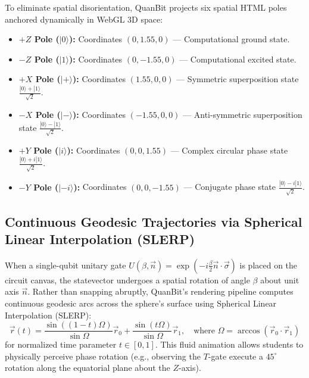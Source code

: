 \documentclass[11pt, a4paper]{article}
\begin{document}
To eliminate spatial disorientation, QuanBit projects six spatial HTML poles anchored dynamically in WebGL 3D space:
\begin{itemize}
	\item \textbf{$+Z$ Pole ($|0\rangle$):} Coordinates $(0, 1.55, 0)$ --- Computational ground state.
	\item \textbf{$-Z$ Pole ($|1\rangle$):} Coordinates $(0, -1.55, 0)$ --- Computational excited state.
	\item \textbf{$+X$ Pole ($|+\rangle$):} Coordinates $(1.55, 0, 0)$ --- Symmetric superposition state $\frac{|0\rangle+|1\rangle}{\sqrt{2}}$.
	\item \textbf{$-X$ Pole ($|-\rangle$):} Coordinates $(-1.55, 0, 0)$ --- Anti-symmetric superposition state $\frac{|0\rangle-|1\rangle}{\sqrt{2}}$.
	\item \textbf{$+Y$ Pole ($|i\rangle$):} Coordinates $(0, 0, 1.55)$ --- Complex circular phase state $\frac{|0\rangle+i|1\rangle}{\sqrt{2}}$.
	\item \textbf{$-Y$ Pole ($|-i\rangle$):} Coordinates $(0, 0, -1.55)$ --- Conjugate phase state $\frac{|0\rangle-i|1\rangle}{\sqrt{2}}$.
\end{itemize}

\subsection{Continuous Geodesic Trajectories via Spherical Linear Interpolation (SLERP)}
When a single-qubit unitary gate $U(\beta, \vec{n}) = \exp(-i \frac{\beta}{2} \vec{n} \cdot \vec{\sigma})$ is placed on the circuit canvas, the statevector undergoes a spatial rotation of angle $\beta$ about unit axis $\vec{n}$. Rather than snapping abruptly, QuanBit's rendering pipeline computes continuous geodesic arcs across the sphere's surface using Spherical Linear Interpolation (SLERP):
\begin{equation}
\vec{r}(t) = \frac{\sin((1-t)\Omega)}{\sin\Omega}\vec{r}_0 + \frac{\sin(t\Omega)}{\sin\Omega}\vec{r}_1, \quad \text{where } \Omega = \arccos(\vec{r}_0 \cdot \vec{r}_1)
\end{equation}
for normalized time parameter $t \in [0, 1]$. This fluid animation allows students to physically perceive phase rotation (e.g., observing the $T$-gate execute a $45^\circ$ rotation along the equatorial plane about the $Z$-axis).
\end{document}
